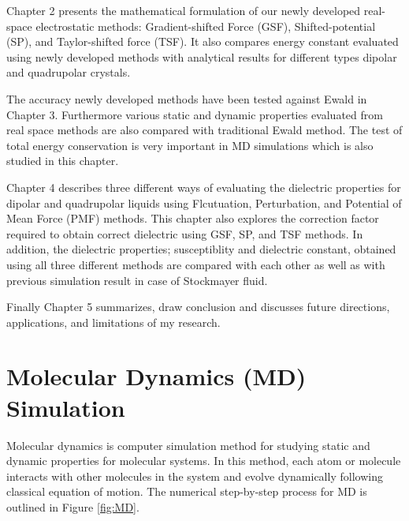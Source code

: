 Chapter 2 presents the mathematical formulation of our newly developed real-space electrostatic methods: Gradient-shifted Force (GSF), Shifted-potential (SP), and Taylor-shifted force (TSF). It also compares energy constant evaluated  using newly developed methods with analytical results for different types dipolar and quadrupolar crystals.

The accuracy newly developed methods have been tested against Ewald in Chapter 3. Furthermore various static and dynamic properties evaluated from real space methods are also compared with traditional Ewald method. The test of total energy conservation is very important in MD simulations which is also studied in this chapter. 

Chapter 4 describes three different ways of evaluating the dielectric properties for dipolar and quadrupolar liquids using Flcutuation, Perturbation, and Potential of Mean Force (PMF) methods. This chapter also explores the correction factor required to obtain correct dielectric using  GSF, SP, and TSF methods. In addition, the dielectric properties; susceptiblity and dielectric constant, obtained using all three different methods are compared with each other as well as with previous simulation result in case of Stockmayer fluid.

Finally Chapter 5 summarizes, draw conclusion and discusses future directions, applications, and limitations of my research. 

\section{Molecular Dynamics (MD) Simulation}

Molecular dynamics is computer simulation method for studying static and dynamic properties for molecular systems. In this method, each atom or molecule interacts with other molecules in the system and evolve dynamically following classical equation of motion. The numerical step-by-step process for MD is outlined in Figure \ref{fig:MD}. 
    
